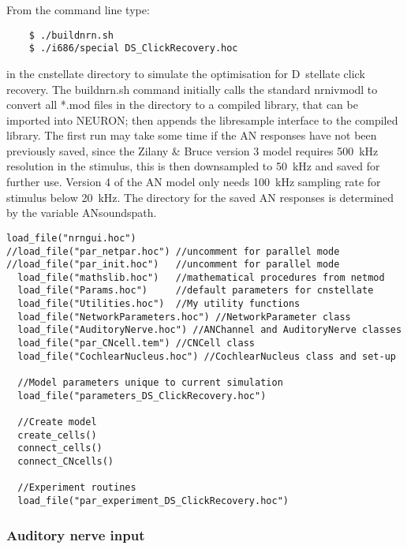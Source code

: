 From the command line type:
\begin{verbatim}
    $ ./buildnrn.sh
    $ ./i686/special DS_ClickRecovery.hoc
\end{verbatim}
in the \textsf{cnstellate} directory to simulate the optimisation for D~stellate
click recovery.  The \textsf{buildnrn.sh} command initially calls the standard
\textsf{nrnivmodl} to convert all *.mod files in the directory to a compiled
library, that can be imported into NEURON; then appends the libresample
interface to the compiled library. The first run may take some time if the AN
responses have not been previously saved, since the Zilany \& Bruce version 3
model requires 500~kHz resolution in the stimulus, this is then downsampled to
50~kHz and saved for further use. Version 4 of the AN model
\citep{ZilanyBruceEtAl:2009} only needs 100~kHz sampling rate for stimulus below
20~kHz. The directory for the saved AN responses is determined by the variable
\textsf{ANsoundspath}.

\begin{lstlisting}[label=lst:headerlines,caption={Headerlines in
    \mbox{\textsf{DS\_ClickRecovery\.hoc}} show a typical setup in a
    \textsf{cnstellate} setup.}]
  load_file("nrngui.hoc") 
//load_file("par_netpar.hoc") //uncomment for parallel mode 
//load_file("par_init.hoc")   //uncomment for parallel mode
  load_file("mathslib.hoc")   //mathematical procedures from netmod
  load_file("Params.hoc")     //default parameters for cnstellate
  load_file("Utilities.hoc")  //My utility functions
  load_file("NetworkParameters.hoc") //NetworkParameter class
  load_file("AuditoryNerve.hoc") //ANChannel and AuditoryNerve classes
  load_file("par_CNcell.tem") //CNCell class
  load_file("CochlearNucleus.hoc") //CochlearNucleus class and set-up

  //Model parameters unique to current simulation
  load_file("parameters_DS_ClickRecovery.hoc")

  //Create model 
  create_cells() 
  connect_cells() 
  connect_CNcells()

  //Experiment routines
  load_file("par_experiment_DS_ClickRecovery.hoc")

\end{lstlisting}


\subsubsection{Auditory nerve input    \label{sec:APDX:auditory-nerve-input}}

